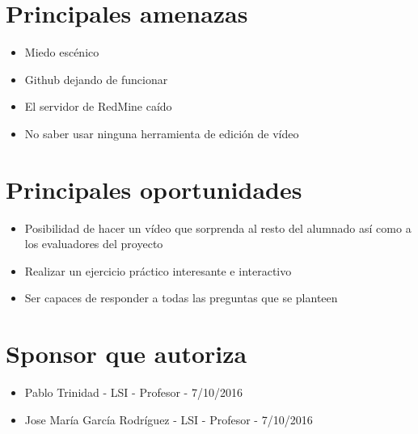 \documentclass[a4paper,10pt]{scrartcl}
\begin{document}
\section{Principales amenazas}
\begin{itemize}
	\item Miedo escénico
	\item Github dejando de funcionar
	\item El servidor de RedMine caído
	\item No saber usar ninguna herramienta de edición de vídeo
\end{itemize}

\section{Principales oportunidades}
\begin{itemize}
	\item Posibilidad de hacer un vídeo que sorprenda al resto del alumnado así como a los evaluadores del proyecto
	\item Realizar un ejercicio práctico interesante e interactivo
	\item Ser capaces de responder a todas las preguntas que se planteen
\end{itemize}

\section{Sponsor que autoriza}
\begin{itemize}
	\item Pablo Trinidad - LSI - Profesor  - 7/10/2016
	\item Jose María García Rodríguez - LSI - Profesor - 7/10/2016
\end{itemize}

\end{document}
